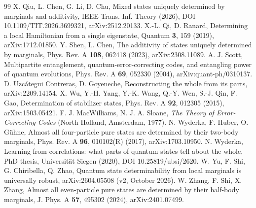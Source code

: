 \documentclass[aps,pra,onecolumn,superscriptaddress,nofootinbib,longbibliography,10pt]{revtex4-2}
\theoremstyle{definition}
\begin{document}
\begin{thebibliography}{99}
 X. Qiu, L. Chen, G. Li, D. Chu, Mixed states uniquely determined by marginals and additivity, IEEE Trans. Inf. Theory (2026), DOI 10.1109/TIT.2026.3699321, arXiv:2512.20133.
 X.-L. Qi, D. Ranard, Determining a local Hamiltonian from a single eigenstate, Quantum \textbf{3}, 159 (2019), arXiv:1712.01850.
 Y. Shen, L. Chen, The additivity of states uniquely determined by marginals, Phys. Rev. A \textbf{108}, 062418 (2023), arXiv:2308.11089.
 A. J. Scott, Multipartite entanglement, quantum-error-correcting codes, and entangling power of quantum evolutions, Phys. Rev. A \textbf{69}, 052330 (2004), arXiv:quant-ph/0310137.
 D. Uzcátegui Contreras, D. Goyeneche, Reconstructing the whole from its parts, arXiv:2209.14154.
 X. Wu, Y.-H. Yang, Y.-K. Wang, Q.-Y. Wen, S.-J. Qin, F. Gao, Determination of stabilizer states, Phys. Rev. A \textbf{92}, 012305 (2015), arXiv:1503.05421.
 F. J. MacWilliams, N. J. A. Sloane, \emph{The Theory of Error-Correcting Codes} (North-Holland, Amsterdam, 1977).
 N. Wyderka, F. Huber, O. Gühne, Almost all four-particle pure states are determined by their two-body marginals, Phys. Rev. A \textbf{96}, 010102(R) (2017), arXiv:1703.10950.
 N. Wyderka, Learning from correlations: what parts of quantum states tell about the whole, PhD thesis, Universität Siegen (2020), DOI 10.25819/ubsi/2620.
 W. Yu, F. Shi, G. Chiribella, Q. Zhao, Quantum state determinability from local marginals is universally robust, arXiv:2604.05508 (v2, October 2026).
 W. Zhang, F. Shi, X. Zhang, Almost all even-particle pure states are determined by their half-body marginals, J. Phys. A \textbf{57}, 495302 (2024), arXiv:2401.07499.
\end{thebibliography}
\end{document}
